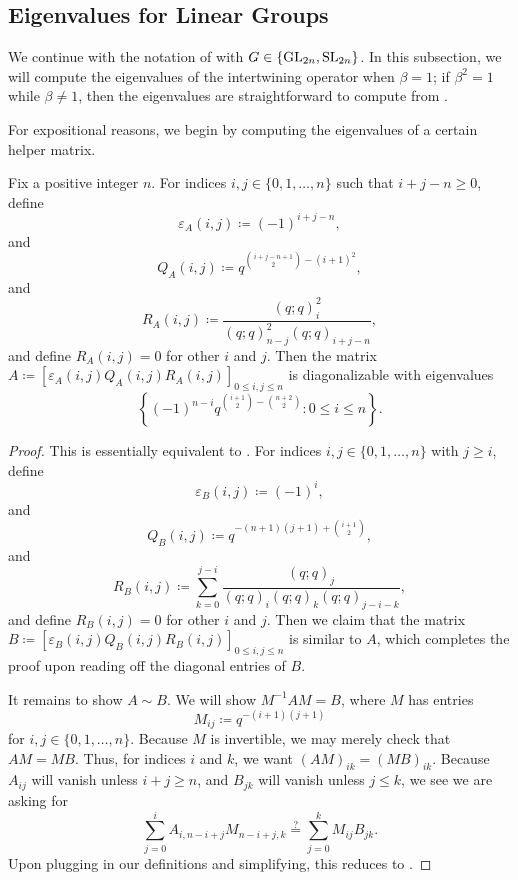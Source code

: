 \subsection{Eigenvalues for Linear Groups}
We continue with the notation of  with $G\in\{\mathrm{GL}_{2n},\mathrm{SL}_{2n}\}$. In this subsection, we will compute the eigenvalues of the intertwining operator when $\beta=1$; if $\beta^2=1$ while $\beta\ne1$, then the eigenvalues are straightforward to compute from .

For expositional reasons, we begin by computing the eigenvalues of a certain helper matrix.
\begin{proposition} \label{prop:gl-helper}
    Fix a positive integer $n$. For indices $i,j\in\{0,1,\ldots,n\}$ such that $i+j-n\ge0$, define
    \[\varepsilon_A(i,j)\coloneqq(-1)^{i+j-n},\]
    and
    \[Q_A(i,j)\coloneqq q^{\binom{i+j-n+1}2-\left(i+1\right)^{2}},\]
    and
    \[R_A(i,j)\coloneqq\frac{(q;q)_i^{2}}{(q;q)_{n-j}^{2}(q;q)_{i+j-n}},\]
    and define $R_A(i,j)=0$ for other $i$ and $j$. Then the matrix $A\coloneqq[\varepsilon_A(i,j)Q_A(i,j)R_A(i,j)]_{0\le i,j\le n}$ is diagonalizable with eigenvalues
    \[\left\{(-1)^{n-i}q^{\binom{i+1}2-\binom{n+2}2}:0\le i\le n\right\}.\]
\end{proposition}
\begin{proof}
    This is essentially equivalent to . For indices $i,j\in\{0,1,\ldots,n\}$ with $j\ge i$, define
    \[\varepsilon_B(i,j)\coloneqq(-1)^i,\]
    and
    \[Q_B(i,j)\coloneqq q^{-(n+1)(j+1)+\binom{i+1}2},\]
    and
    \[R_B(i,j)\coloneqq\sum_{k=0}^{j-i}\frac{(q;q)_j}{(q;q)_i(q;q)_k(q;q)_{j-i-k}},\]
    and define $R_B(i,j)=0$ for other $i$ and $j$. Then we claim that the matrix $B\coloneqq[\varepsilon_B(i,j)Q_B(i,j)R_B(i,j)]_{0\le i,j\le n}$ is similar to $A$, which completes the proof upon reading off the diagonal entries of $B$.

    It remains to show $A\sim B$. We will show $M^{-1}AM=B$, where $M$ has entries
    \[M_{ij}\coloneqq q^{-(i+1)(j+1)}\]
    for $i,j\in\{0,1,\ldots,n\}$. Because $M$ is invertible, we may merely check that $AM=MB$. Thus, for indices $i$ and $k$, we want $(AM)_{ik}=(MB)_{ik}$. Because $A_{ij}$ will vanish unless $i+j\ge n$, and $B_{jk}$ will vanish unless $j\le k$, we see we are asking for
    \[\sum_{j=0}^iA_{i,n-i+j}M_{n-i+j,k}\stackrel?=\sum_{j=0}^kM_{ij}B_{jk}.\]
    Upon plugging in our definitions and simplifying, this reduces to .
\end{proof}
